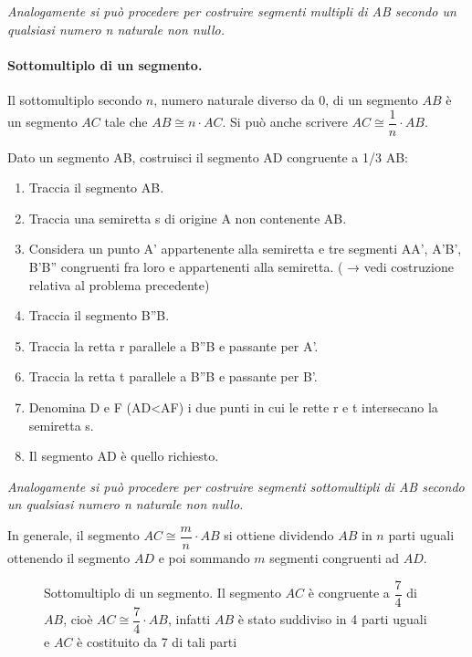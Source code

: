 \textit{Analogamente si può procedere per costruire segmenti multipli di AB 
secondo un qualsiasi numero n naturale non nullo.}

\paragraph{Sottomultiplo di un segmento.} Il sottomultiplo secondo 
$n$, numero naturale diverso da 0, di un segmento $AB$ è un segmento 
$AC$ tale che $AB\cong n\cdot AC$. Si può anche scrivere $AC \cong 
\dfrac{1}{n}\cdot AB$.

\begin{procedura}
	Dato un segmento AB, costruisci il segmento AD congruente a 1/3 AB:
	\begin{enumerate} [nosep]
		\item 
		Traccia il segmento AB.		
		\item 
		Traccia una semiretta s di origine A non contenente AB.		
		\item 
		Considera un punto A' appartenente alla semiretta e tre segmenti AA', A'B', 
		B'B'' congruenti fra loro e appartenenti alla semiretta. ( → vedi costruzione 
		relativa al problema precedente)
		\item 
		Traccia il segmento B''B. 
		\item 
		Traccia la retta r parallele a B''B e passante per A'.			
		\item 
		Traccia la retta t parallele a B''B e passante per B'.			
		\item 
		Denomina D e F (AD<AF) i due punti in cui le rette r e t intersecano la 
		semiretta s.			
		\item 
		Il segmento AD è quello richiesto.		
	\end{enumerate}
\end{procedura}

\textit{Analogamente si può procedere per costruire segmenti sottomultipli di 
AB secondo un qualsiasi numero n naturale non nullo.}

In generale, il segmento $AC\cong\dfrac{m}{n}\cdot AB$ si ottiene 
dividendo $AB$ in $n$ parti uguali ottenendo il segmento $AD$ e poi 
sommando $m$ segmenti congruenti ad $AD$.

\begin{inaccessibleblock}
 \begin{figure}[htb]
\centering
\caption{Sottomultiplo di un segmento. Il segmento $AC$ è congruente 
a $\dfrac{7}{4}$ di $AB$, cioè $AC\cong\dfrac{7}{4}\cdot AB$, infatti 
$AB$ è stato suddiviso in 4 parti uguali e $AC$ è costituito da 7 di 
tali parti}
\end{figure}
\end{inaccessibleblock}

